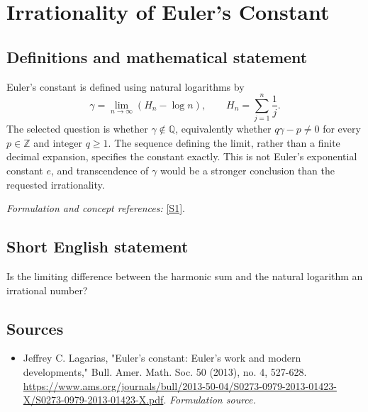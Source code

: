 \documentclass[11pt]{article}
\begin{document}
\section*{\texorpdfstring{Irrationality of Euler's Constant}{Irrationality of Euler's Constant}}\label{1282}
\subsection{Definitions and mathematical statement}
Euler's constant is defined using natural logarithms by
\[
 \gamma=\lim_{n\to\infty}\left(H_n-\log n\right),
 \qquad H_n=\sum_{j=1}^n\frac1j.
\]
The selected question is whether $\gamma\notin{\mathbb{Q}}$, equivalently whether
$q\gamma-p\ne0$ for every $p\in{\mathbb{Z}}$ and integer $q\ge1$. The sequence defining the limit, rather than a finite decimal expansion, specifies the constant exactly. This is not Euler's exponential constant $e$, and transcendence of $\gamma$ would be a stronger conclusion than the requested irrationality.
\par\smallskip\textit{Formulation and concept references:} \href{https://www.ams.org/journals/bull/2013-50-04/S0273-0979-2013-01423-X/S0273-0979-2013-01423-X.pdf}{[S1]}.

\subsection{Short English statement}
Is the limiting difference between the harmonic sum and the natural logarithm an irrational number?
\subsection{Sources}
\begin{itemize}
\item[S1]Jeffrey C. Lagarias, "Euler's constant: Euler's work and modern developments," Bull. Amer. Math. Soc. 50 (2013), no. 4, 527-628.
\url{https://www.ams.org/journals/bull/2013-50-04/S0273-0979-2013-01423-X/S0273-0979-2013-01423-X.pdf}.
\textit{Formulation source.}
\end{itemize}
\end{document}
